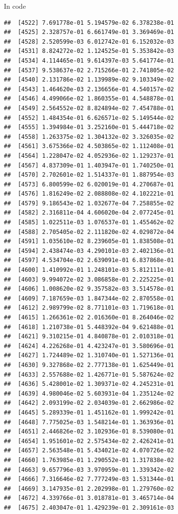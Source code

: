 \documentclass[ignorenonframetext,]{beamer}
\begin{document}
\begin{frame}[fragile]{In code}
\begin{verbatim}
##  [4522] 7.691778e-01 5.194579e-02 6.378238e-01
##  [4525] 2.328757e-01 6.661749e-01 3.369469e-01
##  [4528] 2.520599e-03 6.012742e-01 6.152032e-03
##  [4531] 8.824272e-02 1.124525e-01 5.353842e-03
##  [4534] 4.114465e-01 9.614397e-03 5.641774e-01
##  [4537] 9.538637e-02 2.715266e-01 2.741805e-02
##  [4540] 2.131786e-02 1.139989e-02 9.103349e-02
##  [4543] 1.464620e-03 2.136656e-01 4.540157e-02
##  [4546] 4.499066e-02 1.860355e-01 4.548878e-01
##  [4549] 2.564552e-02 8.824894e-02 7.454788e-01
##  [4552] 1.484354e-01 6.626571e-02 5.149544e-02
##  [4555] 1.394984e-01 3.252160e-01 5.444718e-02
##  [4558] 1.263375e-02 1.304132e-02 3.326035e-02
##  [4561] 3.675366e-02 4.503865e-02 1.112408e-01
##  [4564] 1.228047e-02 4.052936e-02 1.129237e-01
##  [4567] 4.837309e-01 1.403947e-01 1.740250e-01
##  [4570] 2.702601e-02 1.514337e-01 1.887954e-03
##  [4573] 6.800599e-02 6.020019e-01 4.270687e-01
##  [4576] 1.816249e-02 2.088808e-02 4.102221e-01
##  [4579] 9.186543e-02 1.032677e-04 7.258855e-02
##  [4582] 2.316811e-04 4.606020e-04 2.077245e-01
##  [4585] 1.022511e-03 1.076537e-01 1.455462e-02
##  [4588] 2.705405e-02 2.111820e-02 4.029872e-04
##  [4591] 1.035610e-02 8.239605e-01 1.838508e-01
##  [4594] 2.438474e-03 4.290101e-03 2.402136e-01
##  [4597] 4.534704e-02 2.639091e-01 6.837868e-01
##  [4600] 1.410992e-01 1.248101e-03 5.812111e-01
##  [4603] 9.994072e-02 3.086858e-01 2.225225e-01
##  [4606] 1.008620e-02 9.357582e-03 3.514578e-01
##  [4609] 7.187659e-03 1.847344e-02 2.870558e-01
##  [4612] 2.989799e-02 8.771101e-03 1.719618e-01
##  [4615] 1.266361e-02 2.016360e-01 8.264046e-02
##  [4618] 1.210738e-01 5.448392e-04 9.621488e-01
##  [4621] 9.310215e-01 4.840878e-01 2.010318e-01
##  [4624] 4.226268e-01 4.423247e-01 3.580696e-01
##  [4627] 1.724489e-02 1.310740e-01 1.527136e-01
##  [4630] 9.327868e-02 2.777138e-01 1.625449e-01
##  [4633] 2.557688e-02 1.426771e-01 5.587624e-02
##  [4636] 5.428001e-02 1.309371e-02 4.245231e-01
##  [4639] 4.980046e-02 5.603931e-04 1.235124e-02
##  [4642] 2.093199e-02 2.034039e-01 2.662986e-02
##  [4645] 5.289339e-01 1.451162e-01 1.999242e-01
##  [4648] 7.775025e-03 1.548214e-01 1.363936e-01
##  [4651] 2.446826e-02 3.102936e-01 8.539080e-01
##  [4654] 1.951601e-02 2.575434e-02 2.426241e-01
##  [4657] 2.563548e-01 5.434021e-02 4.070726e-02
##  [4660] 1.763985e-01 1.290552e-01 1.317838e-02
##  [4663] 9.657796e-03 3.970959e-01 1.339342e-02
##  [4666] 7.316646e-02 7.777249e-03 1.531344e-01
##  [4669] 3.147935e-01 2.202998e-01 1.279760e-02
##  [4672] 4.339766e-01 3.018781e-01 3.465714e-04
##  [4675] 2.403047e-01 1.429239e-01 2.309161e-03

\end{verbatim}
\end{frame}
\end{document}
